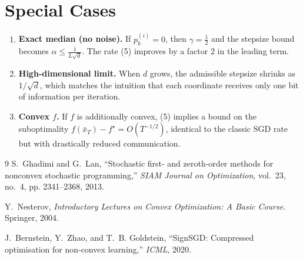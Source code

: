 \documentclass{article}
\begin{document}
\section*{Special Cases}
\begin{enumerate}[label=(\alph*)]
\item \textbf{Exact median (no noise).} If $p_{k}^{(i)}=0$, then $\gamma=\frac12$ and the stepsize bound becomes $\alpha\le\frac{1}{L\sqrt d}$. The rate (5) improves by a factor $2$ in the leading term.
\item \textbf{High‑dimensional limit.} When $d$ grows, the admissible stepsize shrinks as $1/\sqrt d$, which matches the intuition that each coordinate receives only one bit of information per iteration.
\item \textbf{Convex $f$.} If $f$ is additionally convex, (5) implies a bound on the suboptimality $f(\bar{x}_T)-f^{\star}=O(T^{-1/2})$, identical to the classic SGD rate but with drastically reduced communication.
\end{enumerate}

\begin{thebibliography}{9}
S.~Ghadimi and G.~Lan, ``Stochastic first‑ and zeroth‑order methods for nonconvex stochastic programming,'' \emph{SIAM Journal on Optimization}, vol.~23, no.~4, pp. 2341--2368, 2013.

Y.~Nesterov, \emph{Introductory Lectures on Convex Optimization: A Basic Course}. Springer, 2004.

J.~Bernstein, Y.~Zhao, and T.~B. Goldstein, ``SignSGD: Compressed optimisation for non‑convex learning,'' \emph{ICML}, 2020.
\end{thebibliography}
\end{document}
